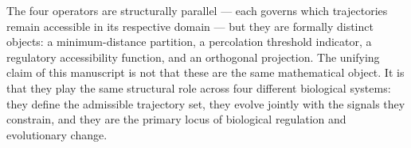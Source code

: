 \documentclass[12pt, a4paper, openany]{book}
\theoremstyle{definition}
\theoremstyle{remark}
\begin{document}
\begin{appendices}
The four operators are structurally parallel — each governs which trajectories remain accessible in its respective domain — but they are formally distinct objects: a minimum-distance partition, a percolation threshold indicator, a regulatory accessibility function, and an orthogonal projection. The unifying claim of this manuscript is not that these are the same mathematical object. It is that they play the same structural role across four different biological systems: they define the admissible trajectory set, they evolve jointly with the signals they constrain, and they are the primary locus of biological regulation and evolutionary change.

\end{appendices}


\backmatter
\end{document}
